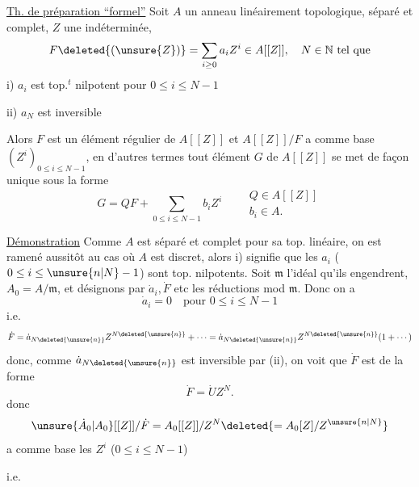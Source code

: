 \uline{Th. de préparation ``formel''} Soit $A$ un anneau linéairement topologique, séparé et complet, $Z$ une indéterminée,
\[
F\deleted{(\unsure{Z})}=\sum_{i\geq0}a_iZ^i\in A[[Z]],\quad N\in\mathbb N\text{ tel que}
\]
i) $a_i$ est top.$^t$ nilpotent pour $0\leq i\leq N-1$

ii) $a_N$ est inversible

Alors $F$ est un élément régulier de $A[[Z]]$ et $A[[Z]]/F$ a comme base $(Z^i)_{0\leq i\leq N-1}$, en d'autres termes tout élément $G$ de $A[[Z]]$ se met de façon unique sous la forme
\[
G=QF+\sum_{0\leq i\leq N-1}b_iZ^i\qquad
\begin{array}{l}Q\in A[[Z]]\\b_i\in A.\end{array}
\]


\uline{Démonstration} Comme $A$ est séparé et complet pour sa top. linéaire, on est ramené aussitôt au cas où $A$ est discret, alors i) signifie que les $a_i$ ($0\leq i\leq\unsure{n|N}-1$) sont top. nilpotents. Soit $\mathfrak m$ l'idéal  qu'ils engendrent, $A_0=A/\mathfrak m$, et désignons par $\dot a_i,\dot F$ etc les réductions mod $\mathfrak m$.  Donc on a 
\[
\dot a_i=0\quad\text{pour }0\leq i\leq N-1
\]
i.e.
\[
\dot F=\dot a_{N\deleted{\unsure{n}}}Z^{N\deleted{\unsure{n}}}+\cdots
=\dot a_{N\deleted{\unsure{n}}}Z^{N\deleted{\unsure{n}}}(1+\cdots)
\]
donc, comme $\dot a_{N\deleted{\unsure{n}}}$ est inversible par (ii), on voit que $\dot F$ est de la forme
\[
\dot F=\dot U Z^N.
\]
 donc
\[
\unsure{\dot A_0|A_0}[[Z]]/\dot F=A_0[[Z]]/Z^N\deleted{=A_0[Z]/Z^{\unsure{n|N}}}
\]
a comme base les $Z^i$ ($0\leq i\leq N-1$)

i.e.

